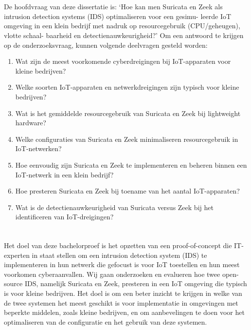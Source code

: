 \section{}%
\label{sec:onderzoeksvraag}

De hoofdvraag van deze dissertatie is: ‘Hoe kan men Suricata en Zeek als intrusion detection systems (IDS) optimaliseren voor een gesimu- leerde IoT omgeving in een klein bedrijf met nadruk op resourcegebruik (CPU/geheugen), vlotte schaal- baarheid en detectienauwkeurigheid?’ Om een antwoord te krijgen op de onderzoeksvraag, kunnen volgende deelvragen gesteld worden:

\begin{enumerate}
	\item Wat zijn de meest voorkomende cyberdreigingen bij IoT-apparaten voor kleine bedrijven?
	\item Welke soorten IoT-apparaten en netwerkdreigingen zijn typisch voor kleine bedrijven?
	\item Wat is het gemiddelde resourcegebruik van Suricata en Zeek bij lightweight hardware?
	\item Welke configuraties van Suricata en Zeek minimaliseren resourcegebruik in IoT-netwerken?
	\item Hoe eenvoudig zijn Suricata en Zeek te implementeren en beheren binnen een IoT-netwerk in een klein bedrijf?
	\item Hoe presteren Suricata en Zeek bij toename van het aantal IoT-apparaten?
	\item Wat is de detectienauwkeurigheid van Suricata versus Zeek bij het identificeren van IoT-dreigingen?
\end{enumerate}

\section{}%
\label{sec:onderzoeksdoelstelling}

Het doel van deze bachelorproef is het opzetten van een proof-of-concept die IT-experten in staat stellen om een intrusion detection system (IDS) te implementeren in hun netwerk die gefocust is voor IoT toestellen en hun meest voorkomen cyberaanvallen. Wij gaan onderzoeken en evalueren hoe twee open-source IDS, namelijk Suricata en Zeek, presteren in een IoT omgeving die typisch is voor kleine bedrijven. Het doel is om een beter inzicht te krijgen in welke van de twee systemen het meest geschikt is voor implementatie in omgevingen met beperkte middelen, zoals kleine bedrijven, en om aanbevelingen te doen voor het optimaliseren van de configuratie en het gebruik van deze systemen.
\vspace{6em}


